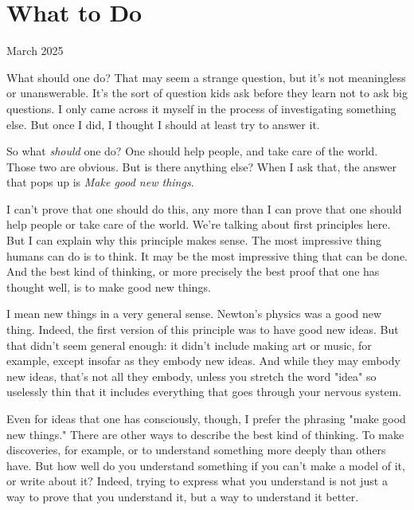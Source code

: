 \chapter{What to Do}


          
        
          


          
            
              
                

March 2025

What should one do? That may seem a
                  strange question, but it's not meaningless or unanswerable.
                  It's the sort of question kids ask before they learn not to
                  ask big questions. I only came across it myself in the process
                  of investigating something else. But once I did, I thought I
                  should at least try to answer it.

So what
                  \emph{should} one do? One should help people, and take care of
                  the world. Those two are obvious. But is there anything else?
                  When I ask that, the answer that pops up is
                  \emph{Make good new things}.

I can't prove that one
                  should do this, any more than I can prove that one should help
                  people or take care of the world. We're talking about first
                  principles here. But I can explain why this principle makes
                  sense. The most impressive thing humans can do is to think. It
                  may be the most impressive thing that can be done. And the
                  best kind of thinking, or more precisely the best proof that
                  one has thought well, is to make good new things.

I
                  mean new things in a very general sense. Newton's physics was
                  a good new thing. Indeed, the first version of this principle
                  was to have good new ideas. But that didn't seem general
                  enough: it didn't include making art or music, for example,
                  except insofar as they embody new ideas. And while they may
                  embody new ideas, that's not all they embody, unless you
                  stretch the word "idea" so uselessly thin that it includes
                  everything that goes through your nervous system.

Even
                  for ideas that one has consciously, though, I prefer the
                  phrasing "make good new things." There are other ways to
                  describe the best kind of thinking. To make discoveries, for
                  example, or to understand something more deeply than others
                  have. But how well do you understand something if you can't
                  make a model of it, or write about it? Indeed, trying to
                  express what you understand is not just a way to prove that
                  you understand it, but a way to understand it better.

